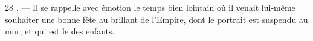\begin{VUpage}[30]{28}
. --- Il se rappelle avec émotion le temps bien\nl
lointain où il venait lui-même souhaiter une bonne\nl
fête au brillant  de l'Empire, dont le portrait\nl
est suspendu au mur, et qui est le  des\nl
enfants.

\VUsaut{6.0mm}
\VUfilet{22mm}
\end{VUpage}
